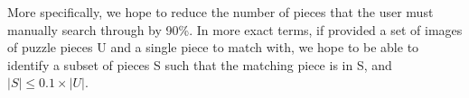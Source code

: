 \documentclass[12pt]{report}
\begin{document}
More specifically, we hope to reduce the number of pieces that the user must manually search through by 90\%. In more exact terms, if provided a set of images of puzzle pieces U and a single piece to match with, we hope to be able to identify a subset of pieces S such that the matching piece is in S, and $\lvert S \rvert \leq 0.1 \times \lvert U \rvert$.

\renewcommand\bibname{References}
%


\end{document}
